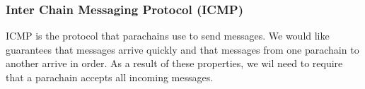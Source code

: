 \subsubsection{Inter Chain Messaging Protocol (ICMP)} \label{sec:ICMP}

ICMP is the protocol that parachains use to send messages. We would like guarantees that messages arrive quickly and that messages from one parachain to another arrive in order. As a result of these properties, we wil need to require that a parachain accepts all incoming messages.



